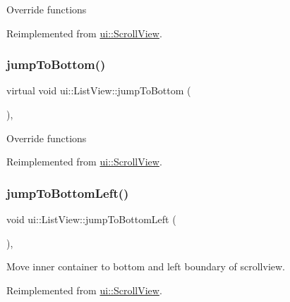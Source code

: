 Override functions 

Reimplemented from \hyperlink{classui_1_1ScrollView_a239246ce0e70711ca19504badf56db13}{ui\+::\+Scroll\+View}.

\mbox{\label{classui_1_1ListView_aeffa88663d344fbba91e24360458e207}} 
\subsubsection{\texorpdfstring{jump\+To\+Bottom()}{jumpToBottom()}\hspace{0.1cm}{\footnotesize\ttfamily [2/2]}}
{\footnotesize\ttfamily virtual void ui\+::\+List\+View\+::jump\+To\+Bottom (\begin{DoxyParamCaption}{ }\end{DoxyParamCaption})\hspace{0.3cm}{\ttfamily [override]}, {\ttfamily [virtual]}}

Override functions 

Reimplemented from \hyperlink{classui_1_1ScrollView_a239246ce0e70711ca19504badf56db13}{ui\+::\+Scroll\+View}.

\mbox{\label{classui_1_1ListView_a298f184bd6a527a03e8a3f28ec20fc6a}} 
\subsubsection{\texorpdfstring{jump\+To\+Bottom\+Left()}{jumpToBottomLeft()}\hspace{0.1cm}{\footnotesize\ttfamily [1/2]}}
{\footnotesize\ttfamily void ui\+::\+List\+View\+::jump\+To\+Bottom\+Left (\begin{DoxyParamCaption}{ }\end{DoxyParamCaption})\hspace{0.3cm}{\ttfamily [override]}, {\ttfamily [virtual]}}

Move inner container to bottom and left boundary of scrollview. 

Reimplemented from \hyperlink{classui_1_1ScrollView_aa06afeba18463d129dfdc3a9352aaf4a}{ui\+::\+Scroll\+View}.

